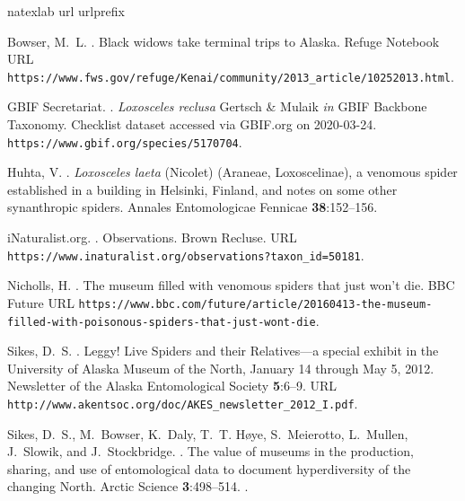 \begin{thebibliography}{9}
\expandafter\ifx\csname natexlab\endcsname\relax\def\natexlab#1{#1}\fi
\expandafter\ifx\csname url\endcsname\relax
  \def\url#1{{\tt #1}}\fi
\expandafter\ifx\csname urlprefix\endcsname\relax\def\urlprefix{{\small URL}
  }\fi

Bowser, M.~L.
.
\newblock Black widows take terminal trips to Alaska.
\newblock Refuge Notebook
  \urlprefix\url{https://www.fws.gov/refuge/Kenai/community/2013_article/10252013.html}.

{GBIF Secretariat}.
.
\newblock \textit{Loxosceles reclusa} Gertsch \& Mulaik \textit{in} GBIF
  Backbone Taxonomy. Checklist dataset accessed via GBIF.org on 2020-03-24.
\newblock \urlprefix\url{https://www.gbif.org/species/5170704}.

Huhta, V.
.
\newblock \textit{Loxosceles laeta} (Nicolet) (Araneae, Loxoscelinae), a
  venomous spider established in a building in Helsinki, Finland, and notes on
  some other synanthropic spiders.
\newblock Annales Entomologicae Fennicae {\bfseries 38}:152--156.

iNaturalist.org.
.
\newblock Observations. Brown Recluse.
\newblock
  \urlprefix\url{https://www.inaturalist.org/observations?taxon_id=50181}.

Nicholls, H.
.
\newblock The museum filled with venomous spiders that just won't die.
\newblock BBC Future
  \urlprefix\url{https://www.bbc.com/future/article/20160413-the-museum-filled-with-poisonous-spiders-that-just-wont-die}.

Sikes, D.~S.
.
\newblock Leggy! Live Spiders and their Relatives—a special exhibit in the
  University of Alaska Museum of the North, January 14 through May 5, 2012.
\newblock Newsletter of the Alaska Entomological Society {\bfseries 5}:6--9.
\newblock
  \urlprefix\url{http://www.akentsoc.org/doc/AKES_newsletter_2012_I.pdf}.

Sikes, D.~S., M.~Bowser, K.~Daly, T.~T. Høye, S.~Meierotto, L.~Mullen,
  J.~Slowik, and J.~Stockbridge.
.
\newblock The value of museums in the production, sharing, and use of
  entomological data to document hyperdiversity of the changing North.
\newblock Arctic Science {\bfseries 3}:498--514.
\newblock {}.


\end{thebibliography}
